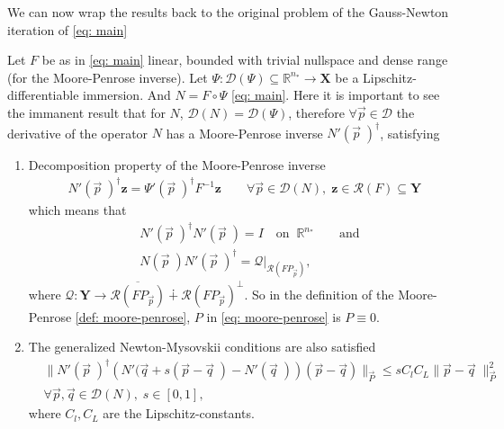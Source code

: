 We can now wrap the results back to the original problem of the Gauss-Newton
iteration of \ref{eq: main}
\begin{lemma}
    Let $F$ be as in \ref{eq: main} linear, bounded with trivial nullspace
    and dense range (for the Moore-Penrose inverse). Let $\Psi:
    \mathcal{D}(\Psi)\subseteq \mathbb{R}^{n_*} \to \mathbf{X}$ be a
    Lipschitz-differentiable immersion. And $N = F\circ \Psi$ \ref{eq: main}.
    Here it is important to see the immanent result that for $N$,
    $\mathcal{D}(N) = \mathcal{D}(\Psi)$, therefore $\forall \vec{p} \in
    \mathcal{D}$ the derivative of the operator $N$ has a Moore-Penrose
    inverse $N'(\vec{p}\;)^{\dagger}$, satisfying
    \begin{enumerate}
        \item Decomposition property of the Moore-Penrose inverse
            \begin{align}
                N'(\vec{p}\;)^{\dagger}\mathbf{z} =
                \Psi'(\vec{p}\;)^{\dagger}F^{-1}\mathbf{z} \qquad \forall
                \vec{p} \in \mathcal{D}(N),\; \mathbf{z} \in \mathcal{R}(F)
                \subseteq \mathbf{Y}
            \end{align}
            which means that
            \begin{align}
                &N'(\vec{p}\;)^{\dagger}N'(\vec{p}\;) = I \quad \text{on} \;\;
                \mathbb{R}^{n_*} \qquad \text{and}\\
                &N(\vec{p}\;)N'(\vec{p}\;)^{\dagger} =
                \mathcal{Q}|_{\mathcal{R}(FP_{\vec{p}})},
            \end{align}
            where $\mathcal{Q} : \mathbf{Y} \to
            \overline{\mathcal{R}(FP_{\vec{p}})}\dotplus\mathcal{R}(FP_{\vec{p}})^{\perp}$.
            So in the definition of the Moore-Penrose \ref{def:
            moore-penrose}, $P$ in \ref{eq: moore-penrose} is $P \equiv 0$.
        \item The generalized Newton-Mysovskii conditions are also satisfied
            \begin{align}
                &\big\| N'(\vec{p}\;)^{\dagger}\left( N'(\vec{q} + s(\vec{p} -
                \vec{q}\;) - N'(\vec{q}\;)\right) (\vec{p} - \vec{q})
                \big\|_{\vec{P}}
                \leq s C_l C_L \|\vec{p} - \vec{q} \;\|^{2}_{\vec{P}}\\
                & \forall \vec{p}, \vec{q} \in \mathcal{D}(N), \; s \in[0,
                1],
            \end{align}
            where $C_l, C_L$ are the Lipschitz-constants.
    \end{enumerate}
\end{lemma}
